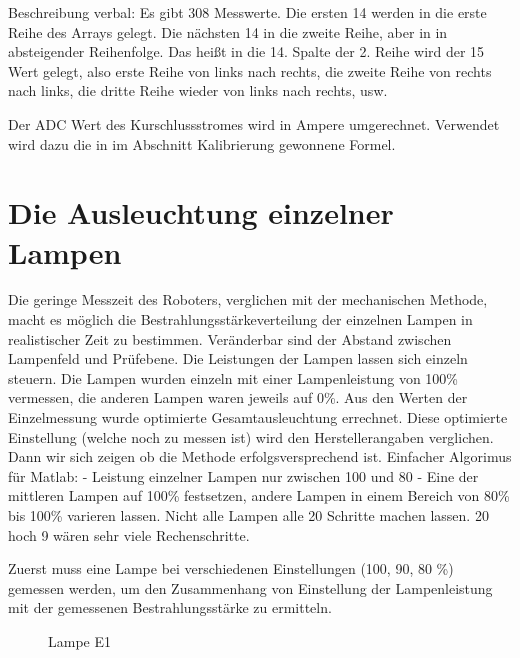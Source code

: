 \documentclass[a4paper,bibtotoc,oneside]{scrbook}
\begin{document}
Beschreibung verbal: Es gibt 308 Messwerte. Die ersten 14 werden in die erste Reihe des Arrays gelegt. Die nächsten 14 in die zweite Reihe, aber in in absteigender Reihenfolge. Das heißt in die 14. Spalte der 2. Reihe wird der 15 Wert gelegt, also erste Reihe von links nach rechts, die zweite Reihe von rechts nach links, die dritte Reihe wieder von links nach rechts, usw.







Der ADC Wert des Kurschlussstromes wird in Ampere umgerechnet. Verwendet wird dazu die in im Abschnitt Kalibrierung gewonnene Formel.



\section{Die Ausleuchtung einzelner Lampen}

Die geringe Messzeit des Roboters, verglichen mit der mechanischen Methode, macht es möglich die Bestrahlungsstärkeverteilung der einzelnen Lampen in realistischer Zeit zu bestimmen.
Veränderbar sind der Abstand zwischen Lampenfeld und Prüfebene. Die Leistungen der Lampen lassen sich einzeln steuern. 
Die Lampen wurden einzeln mit einer Lampenleistung von 100\% vermessen, die anderen Lampen waren jeweils auf 0\%. Aus den Werten der Einzelmessung wurde optimierte Gesamtausleuchtung errechnet. Diese optimierte Einstellung (welche noch zu messen ist) wird den Herstellerangaben verglichen. Dann wir sich zeigen ob die Methode erfolgsversprechend ist.
Einfacher Algorimus für Matlab:
- Leistung einzelner Lampen nur zwischen 100 und 80%
- Eine der mittleren Lampen auf 100\% festsetzen, andere Lampen in einem Bereich von 80\% bis 100\% varieren lassen. Nicht alle Lampen alle 20 Schritte machen lassen. 20 hoch 9 wären sehr viele Rechenschritte.

Zuerst muss eine Lampe bei verschiedenen Einstellungen (100, 90, 80 \%) gemessen werden, um den Zusammenhang von Einstellung der Lampenleistung mit der gemessenen Bestrahlungsstärke zu ermitteln.

\begin{figure} [htbp]
\caption{Lampe E1}
\label{E1}
\end{figure} 
\end{document}
